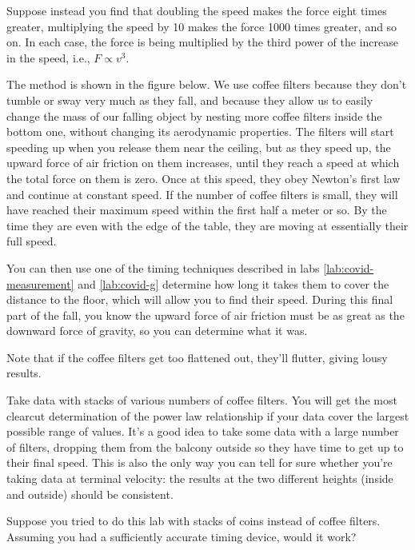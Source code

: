 Suppose instead you find that doubling the speed makes the
force eight times greater, multiplying the speed by 10 makes
the force 1000 times greater, and so on. In each case, the
force is being multiplied by the third power of the increase
in the speed, i.e., $F\propto v^3$.

\observations

The method is shown in the figure below. We use coffee
filters because they don't tumble or sway very much as they
fall, and because they allow us to easily change the mass of
our falling object by nesting more coffee filters inside the
bottom one, without changing its aerodynamic properties.
The filters will start speeding up when you release them
near the ceiling, but as they speed up, the upward force of
air friction on them increases, until they reach a speed at
which the total force on them is zero. Once at this speed,
they obey Newton's first law and continue at constant speed.
If the number of coffee filters is small,
they will have reached their maximum speed within the first
half a meter or so. By the time they are even with the edge
of the table, they are moving at essentially their full
speed.

You can then use one of the timing techniques described in labs \ref{lab:covid-measurement} and
\ref{lab:covid-g} determine how long
it takes them to cover the distance to the floor, which will
allow you to find their speed. During this final part of the
fall, you know the upward force of air friction must be as
great as the downward force of gravity, so you can
determine what it was.


Note that if the coffee filters get too flattened out,
they'll flutter, giving lousy results.

Take data with stacks of various numbers of coffee filters.
You will get the most clearcut determination of the power
law relationship if your data cover the largest possible
range of values. It's a good idea to take some data with a
large number of filters, dropping them from the balcony
outside so they have time to get up to their final speed.
This is also the only way you can tell for sure whether you're
taking data at terminal velocity: the results at the two different
heights (inside and outside) should be consistent.


\prelab

\prelabquestion Suppose you tried to do this lab with stacks of coins
instead of coffee filters. Assuming you had a sufficiently
accurate timing device, would it work?

